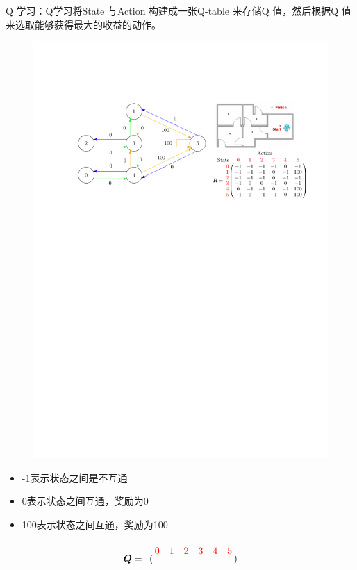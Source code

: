 \begin{example}
    Q 学习：Q学习将State 与Action 构建成一张Q-table 来存储Q 值，然后根据Q 值来选取能够获得最大的收益的动作。
    \begin{figure}[htbp]
        \centering
        \includegraphics[scale = 0.8]{image/Q学习.pdf}
    \end{figure}
    \begin{itemize}
        \item -1表示状态之间是不互通
        \item 0表示状态之间互通，奖励为0
        \item 100表示状态之间互通，奖励为100
    \end{itemize}
    \[
        \boldsymbol{Q} =
        \bordermatrix{
            & \textcolor{red}{0} & \textcolor{red}{1} & \textcolor{red}{2} & \textcolor{red}{3} & \textcolor{red}{4} & \textcolor{red}{5} \cr
}\]
\end{example}
